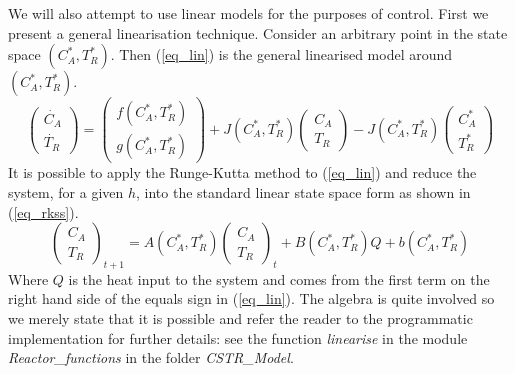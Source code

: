 \documentclass[../masters.tex]{subfiles}
\begin{document}
We will also attempt to use linear models for the purposes of control. First we present a general linearisation technique. Consider an arbitrary point in the state space $(C_A^*, T_R^*)$. Then (\ref{eq_lin}) is the general linearised model around $(C_A^*, T_R^*)$.
\begin{equation}
\begin{pmatrix}
\dot{C_A} \\ \dot{T_R}
\end{pmatrix} = \begin{pmatrix}
f(C_A^*, T_R^*) \\ g(C_A^*, T_R^*)
\end{pmatrix} + J(C_A^*, T_R^*)\begin{pmatrix}
C_A \\ T_R
\end{pmatrix} - J(C_A^*, T_R^*)\begin{pmatrix}
C_A^* \\ T_R^*
\end{pmatrix}
\label{eq_lin}
\end{equation}
It is possible to apply the Runge-Kutta method to (\ref{eq_lin}) and reduce the system, for a given $h$, into the standard linear state space form as shown in (\ref{eq_rkss}). 
\begin{equation}
\begin{pmatrix}
C_A \\ T_R
\end{pmatrix}_{t+1} = A(C_A^*, T_R^*) \begin{pmatrix}
C_A \\ T_R
\end{pmatrix}_{t} + B(C_A^*, T_R^*)Q + b(C_A^*, T_R^*)
\label{eq_rkss}
\end{equation}
Where $Q$ is the heat input to the system and comes from the first term on the right hand side of the equals sign in (\ref{eq_lin}). The algebra is quite involved so we merely state that it is possible and refer the reader to the programmatic implementation for further details: see the function \textit{linearise} in the module \textit{Reactor\_functions} in the folder \textit{CSTR\_Model}.





\end{document}
